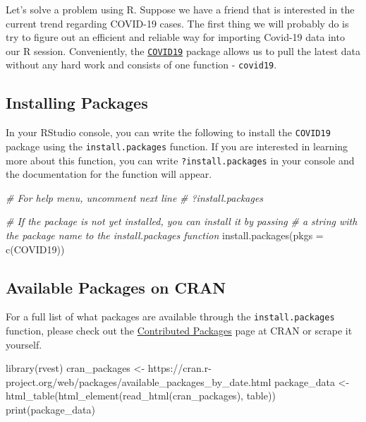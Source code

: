 \documentclass[
]{book}
\newenvironment{Shaded}{\begin{snugshade}}{\end{snugshade}}
\newcommand{\AttributeTok}[1]{\textcolor[rgb]{0.77,0.63,0.00}{#1}}
\newcommand{\CommentTok}[1]{\textcolor[rgb]{0.56,0.35,0.01}{\textit{#1}}}
\newcommand{\FunctionTok}[1]{\textcolor[rgb]{0.00,0.00,0.00}{#1}}
\newcommand{\NormalTok}[1]{#1}
\newcommand{\OtherTok}[1]{\textcolor[rgb]{0.56,0.35,0.01}{#1}}
\newcommand{\StringTok}[1]{\textcolor[rgb]{0.31,0.60,0.02}{#1}}
\begin{document}
Let's solve a problem using R. Suppose we have a friend that is interested in the current trend regarding COVID-19 cases. The first thing we will probably do is try to figure out an efficient and reliable way for importing Covid-19 data into our R session. Conveniently, the \href{https://covid19datahub.io/articles/r.html}{\texttt{COVID19}} package allows us to pull the latest data without any hard work and consists of one function - \texttt{covid19}.

\hypertarget{installing-packages}{%
\subsection{Installing Packages}\label{installing-packages}}

In your RStudio console, you can write the following to install the \texttt{COVID19} package using the \texttt{install.packages} function. If you are interested in learning more about this function, you can write \texttt{?install.packages} in your console and the documentation for the function will appear.

\begin{Shaded}
\begin{Highlighting}[]
\CommentTok{\# For help menu, uncomment next line}
\CommentTok{\# ?install.packages }

\CommentTok{\# If the package is not yet installed, you can install it by passing }
\CommentTok{\# a string with the package name to the \textasciigrave{}install.packages\textasciigrave{} function}
\FunctionTok{install.packages}\NormalTok{(}\AttributeTok{pkgs =} \FunctionTok{c}\NormalTok{(}\StringTok{\textquotesingle{}COVID19\textquotesingle{}}\NormalTok{))}
\end{Highlighting}
\end{Shaded}

\hypertarget{available-packages-on-cran}{%
\subsection{Available Packages on CRAN}\label{available-packages-on-cran}}

For a full list of what packages are available through the \texttt{install.packages} function, please check out the \href{https://cran.r-project.org/web/packages/index.html}{Contributed Packages} page at CRAN or scrape it yourself.\\

\begin{Shaded}
\begin{Highlighting}[]
\FunctionTok{library}\NormalTok{(rvest)}
\NormalTok{cran\_packages }\OtherTok{\textless{}{-}} \StringTok{\textquotesingle{}https://cran.r{-}project.org/web/packages/available\_packages\_by\_date.html\textquotesingle{}}
\NormalTok{package\_data }\OtherTok{\textless{}{-}} \FunctionTok{html\_table}\NormalTok{(}\FunctionTok{html\_element}\NormalTok{(}\FunctionTok{read\_html}\NormalTok{(cran\_packages), }\StringTok{\textquotesingle{}table\textquotesingle{}}\NormalTok{))}
\FunctionTok{print}\NormalTok{(package\_data)}
\end{Highlighting}
\end{Shaded}
\end{document}

